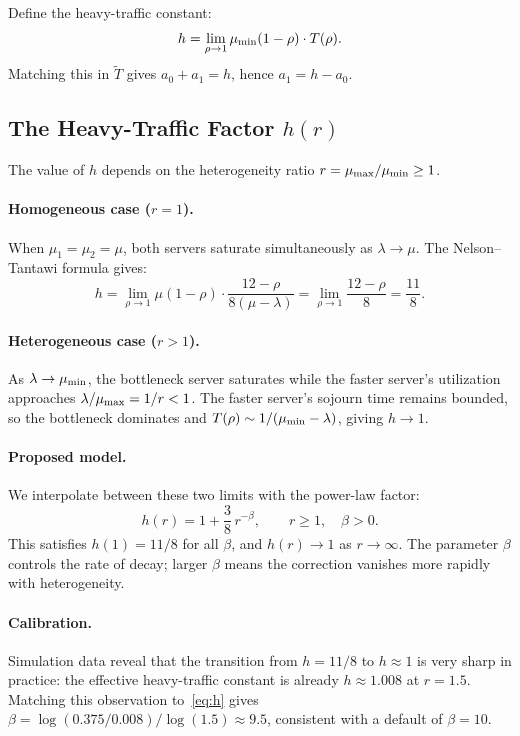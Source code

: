 Define the heavy-traffic constant:
\begin{equation}
  h = \lim_{\rho \to 1} \mu_{\min}(1-\rho)\cdot T(\rho).
\end{equation}
Matching this in $\tilde{T}$ gives $a_0 + a_1 = h$, hence $a_1 = h - a_0$.

\subsection{The Heavy-Traffic Factor $h(r)$}

The value of $h$ depends on the heterogeneity ratio $r = \mu_{\max}/\mu_{\min} \geq 1$.

\paragraph{Homogeneous case ($r = 1$).}
When $\mu_1 = \mu_2 = \mu$, both servers saturate simultaneously as
$\lambda \to \mu$.
The Nelson--Tantawi formula gives:
\begin{equation}
  h = \lim_{\rho\to1}\mu(1-\rho)\cdot\frac{12-\rho}{8(\mu-\lambda)}
    = \lim_{\rho\to1}\frac{12-\rho}{8} = \frac{11}{8}.
\end{equation}

\paragraph{Heterogeneous case ($r > 1$).}
As $\lambda \to \mu_{\min}$, the bottleneck server saturates while the faster
server's utilization approaches $\lambda/\mu_{\max} = 1/r < 1$.
The faster server's sojourn time remains bounded, so the bottleneck dominates
and $T(\rho) \sim 1/(\mu_{\min} - \lambda)$, giving $h \to 1$.

\paragraph{Proposed model.}
We interpolate between these two limits with the power-law factor:
\begin{equation}
  \label{eq:h}
  h(r) = 1 + \frac{3}{8}\,r^{-\beta}, \qquad r \geq 1,\quad \beta > 0.
\end{equation}
This satisfies $h(1) = 11/8$ for all $\beta$, and $h(r) \to 1$ as
$r \to \infty$.
The parameter $\beta$ controls the rate of decay; larger $\beta$ means the
correction vanishes more rapidly with heterogeneity.

\paragraph{Calibration.}
Simulation data reveal that the transition from $h = 11/8$ to $h \approx 1$
is very sharp in practice: the effective heavy-traffic constant is already
$h \approx 1.008$ at $r = 1.5$.
Matching this observation to~\eqref{eq:h} gives
$\beta = \log(0.375/0.008)/\log(1.5) \approx 9.5$,
consistent with a default of $\beta = 10$.

